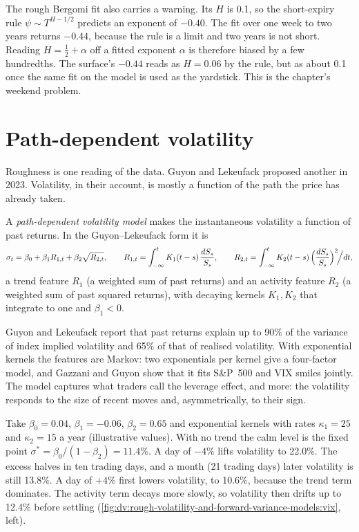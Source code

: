 The rough Bergomi fit also carries a warning. Its $H$ is 0.1, so the short-expiry rule
$\psi\sim T^{H-1/2}$ predicts an exponent of $-0.40$. The fit over one week to two years returns $-0.44$,
because the rule is a limit and two years is not short. Reading $H=\frac12+\alpha$ off a fitted exponent
$\alpha$ is therefore biased by a few hundredths. The surface's $-0.44$ reads as $H=0.06$ by the rule, but
as about 0.1 once the same fit on the model is used as the yardstick. This is the chapter's weekend problem.

\section{Path-dependent volatility}

Roughness is one reading of the data. Guyon and Lekeufack proposed another in 2023. Volatility, in their
account, is mostly a function of the path the price has already taken.

\begin{definition}\label{def:dv:rough-volatility-and-forward-variance-models:pdv}
A \emph{path-dependent volatility model} makes the instantaneous
volatility a function of past returns. In the Guyon--Lekeufack form it is
\[
\sigma_t=\beta_0+\beta_1R_{1,t}+\beta_2\sqrt{R_{2,t}},\qquad
R_{1,t}=\int_{-\infty}^tK_1(t-s)\,\frac{dS_s}{S_s},\qquad R_{2,t}=\int_{-\infty}^tK_2(t-s)\,\Bigl(\frac{dS_s}{S_s}\Bigr)^2\!\Big/dt,
\]
a trend feature $R_1$ (a weighted sum of past returns) and an activity feature $R_2$ (a weighted sum of past
squared returns), with decaying kernels $K_1,K_2$ that integrate to one and $\beta_1<0$.
\end{definition}

Guyon and Lekeufack report that past returns explain up to 90\% of the variance of index implied volatility
and 65\% of that of realised volatility. With exponential kernels the features are Markov: two exponentials
per kernel give a four-factor model, and Gazzani and Guyon show that it fits S\&P~500 and VIX smiles jointly.
The model captures what traders call the leverage effect, and more: the volatility responds to the size of
recent moves and, asymmetrically, to their sign.

\begin{example}\label{ex:dv:rough-volatility-and-forward-variance-models:pdv}
Take $\beta_0=0.04$, $\beta_1=-0.06$, $\beta_2=0.65$ and exponential kernels with rates $\kappa_1=25$ and
$\kappa_2=15$ a year (illustrative values). With no trend the calm level is the fixed point
$\sigma^*=\beta_0/(1-\beta_2)=11.4\%$. A day of $-4\%$ lifts volatility to 22.0\%. The excess halves in ten
trading days, and a month (21 trading days) later volatility is still 13.8\%. A day of $+4\%$ first lowers volatility, to 10.6\%,
because the trend term dominates. The activity term decays more slowly, so volatility then drifts up to 12.4\%
before settling (\cref{fig:dv:rough-volatility-and-forward-variance-models:vix}, left).
\end{example}

